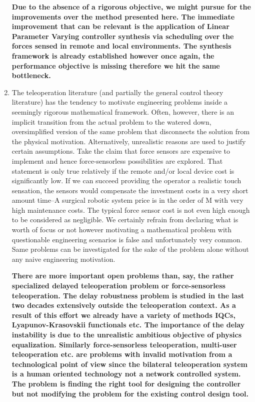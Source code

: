\begin{enumerate}
    {\bfseries Due to the absence of a rigorous objective, we might pursue for the improvements over the method presented here. The 
    immediate improvement that can be relevant is the application of Linear Parameter Varying controller synthesis via scheduling over the 
    forces sensed in remote and local environments. The synthesis framework is already established however once again, the performance 
    objective is missing therefore we hit the same bottleneck. 
    }
    \item The teleoperation literature (and partially the general control theory literature) has the tendency to motivate engineering 
    problems inside a seemingly rigorous mathematical framework. Often, however, there is an implicit transition from the actual problem to 
    the watered down, oversimplified version of the same problem that disconnects the solution from the physical motivation. Alternatively, 
    unrealistic reasons are used to justify certain assumptions. Take the claim that force sensors are expensive to implement and hence 
    force-sensorless possibilities are explored. That statement is only true relatively if the remote and/or local device cost is 
    significantly low. If we can succeed providing the operator a realistic touch sensation, the sensors would compensate the investment 
    costs in a very short amount time--A surgical robotic system price is in the order of M\EUR{} with very high maintenance 
    costs. The typical force sensor cost is not even high enough to be considered as negligible. We certainly refrain from declaring what 
    is worth of focus or not however motivating a mathematical problem with questionable engineering scenarios is false and unfortunately 
    very common. Same problems can be investigated for the sake of the problem alone without any naive engineering motivation.
    
    {\bfseries There are more important open problems than, say, the rather specialized delayed teleoperation problem or force-sensorless 
    teleoperation. The delay robustness problem is studied in the last two decades extensively outside the teleoperation context. As a 
    result of this effort we already have a variety of methods IQCs, Lyapunov-Krasovskii functionals etc. The importance of the delay 
    instability is due to the unrealistic ambitious objective of physics equalization. Similarly force-sensorless teleoperation, multi-user 
    teleoperation etc. are problems with invalid motivation from a technological point of view since the bilateral teleoperation system is 
    a human oriented technology not a network controlled system. The problem is finding the right tool for designing the controller but 
    not modifying the problem for the existing control design tool.
    }
    
\end{enumerate}


